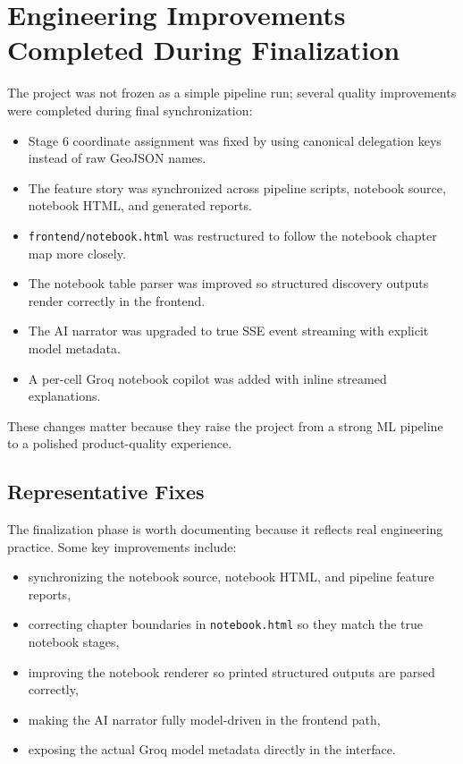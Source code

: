 \documentclass[11pt,a4paper]{article}
\newcommand{\code}[1]{\texttt{#1}}
\begin{document}
\section{Engineering Improvements Completed During Finalization}

The project was not frozen as a simple pipeline run; several quality improvements were completed during final synchronization:

\begin{itemize}
\item Stage 6 coordinate assignment was fixed by using canonical delegation keys instead of raw GeoJSON names.
\item The feature story was synchronized across pipeline scripts, notebook source, notebook HTML, and generated reports.
\item \code{frontend/notebook.html} was restructured to follow the notebook chapter map more closely.
\item The notebook table parser was improved so structured discovery outputs render correctly in the frontend.
\item The AI narrator was upgraded to true SSE event streaming with explicit model metadata.
\item A per-cell Groq notebook copilot was added with inline streamed explanations.
\end{itemize}

These changes matter because they raise the project from a strong ML pipeline to a polished product-quality experience.

\subsection{Representative Fixes}

The finalization phase is worth documenting because it reflects real engineering practice. Some key improvements include:

\begin{itemize}
\item synchronizing the notebook source, notebook HTML, and pipeline feature reports,
\item correcting chapter boundaries in \code{notebook.html} so they match the true notebook stages,
\item improving the notebook renderer so printed structured outputs are parsed correctly,
\item making the AI narrator fully model-driven in the frontend path,
\item exposing the actual Groq model metadata directly in the interface.
\end{itemize}
\end{document}
